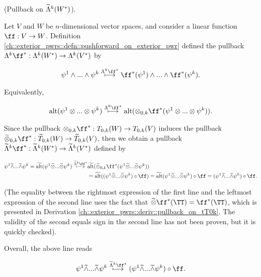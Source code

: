 \begin{deriv}
\label{ch::exterior_pwrs::deriv::pullback_on_exterior_pwr_of_actual_fns}
    (Pullback on $\widetilde{\Lambda}^k(W^*)$).
    
    Let $V$ and $W$ be $n$-dimensional vector spaces, and consider a linear function $\ff:V \rightarrow W$. Definition \ref{ch::exterior_pwrs::defn::pushforward_on_exterior_pwr} defined the pullback $\Lambda^k \ff^*:\Lambda^k(W^*) \rightarrow \Lambda^k(V^*)$ by
    
    \begin{align*}
        \psi^1 \wedge ... \wedge \psi^k \overset{\Lambda^k \ff^*}{\longmapsto} \ff^*(\psi^1) \wedge ... \wedge \ff^*(\psi^k).
    \end{align*}
    
    Equivalently,
    
    \begin{align*}
        \alt(\psi^1 \otimes ... \otimes \psi^k) \overset{\Lambda^k \ff^*}{\longmapsto} \alt(\otimes_{0, k} \ff^*(\psi^1 \otimes ... \otimes \psi^k)).
    \end{align*}
    
    Since the pullback $\otimes_{0, k} \ff^*:T_{0,k}(W) \rightarrow T_{0,k}(V)$ induces the pullback $\totimes_{0,k} \ff^*:\tT_{0,k}(W) \rightarrow \tT_{0,k}(V)$, then we obtain a pullback $\tLambda^k \ff^*:\tLambda^k(W^*) \rightarrow \tLambda^k(V^*)$ defined by
    
    \begin{align*}
        \psi^1 \twedge ... \twedge \psi^k = \talt(\psi^1 \totimes ... \totimes \psi^k) \overset{\tLambda^k \ff^*}{\longmapsto}
        &\talt(\totimes_{0,k} \ff^*(\psi^1 \totimes ... \totimes \psi^k)) \\ 
        &= \talt((\psi^1 \totimes ... \totimes \psi^k) \circ \ff) = \talt(\psi^1 \totimes ... \totimes \psi^k) \circ \ff
        = (\psi^1 \twedge ... \twedge \psi^k) \circ \ff.
    \end{align*}
    
    (The equality between the rightmost expression of the first line and the leftmost expression of the second line uses the fact that $\totimes \ff^*(\TT) = \ff^*(\TT)$, which is presented in Derivation \ref{ch::exterior_pwrs::deriv::pullback_on_tT0k}. The validity of the second equals sign in the second line has not been proven, but it is quickly checked).
    
    Overall, the above line reads
    
    \begin{align*}
        \psi^1 \twedge ... \twedge \psi^k \overset{\tLambda^k \ff^*}{\longmapsto} (\psi^1 \twedge ... \twedge \psi^k) \circ \ff.
    \end{align*}
    

\end{deriv}
